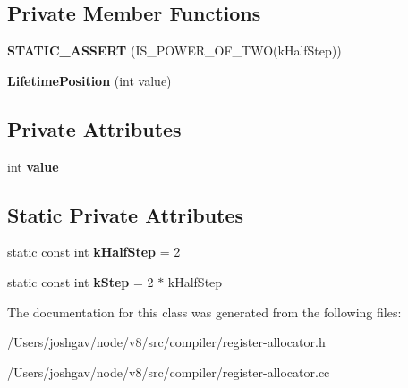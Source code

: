 \subsection*{Private Member Functions}
\begin{DoxyCompactItemize}
\item 
{\bfseries S\+T\+A\+T\+I\+C\+\_\+\+A\+S\+S\+E\+RT} (I\+S\+\_\+\+P\+O\+W\+E\+R\+\_\+\+O\+F\+\_\+\+T\+WO(k\+Half\+Step))\hypertarget{classv8_1_1internal_1_1compiler_1_1_lifetime_position_a87038ab747a896e034d24b830b7c9047}{}\label{classv8_1_1internal_1_1compiler_1_1_lifetime_position_a87038ab747a896e034d24b830b7c9047}

\item 
{\bfseries Lifetime\+Position} (int value)\hypertarget{classv8_1_1internal_1_1compiler_1_1_lifetime_position_ab504ab1e4af9c91c5551335b840c2344}{}\label{classv8_1_1internal_1_1compiler_1_1_lifetime_position_ab504ab1e4af9c91c5551335b840c2344}

\end{DoxyCompactItemize}
\subsection*{Private Attributes}
\begin{DoxyCompactItemize}
\item 
int {\bfseries value\+\_\+}\hypertarget{classv8_1_1internal_1_1compiler_1_1_lifetime_position_adfd9cc95ded60a9977c4ede147b374b4}{}\label{classv8_1_1internal_1_1compiler_1_1_lifetime_position_adfd9cc95ded60a9977c4ede147b374b4}

\end{DoxyCompactItemize}
\subsection*{Static Private Attributes}
\begin{DoxyCompactItemize}
\item 
static const int {\bfseries k\+Half\+Step} = 2\hypertarget{classv8_1_1internal_1_1compiler_1_1_lifetime_position_a909fe3ac1a2266279c4fb64980374771}{}\label{classv8_1_1internal_1_1compiler_1_1_lifetime_position_a909fe3ac1a2266279c4fb64980374771}

\item 
static const int {\bfseries k\+Step} = 2 $\ast$ k\+Half\+Step\hypertarget{classv8_1_1internal_1_1compiler_1_1_lifetime_position_a2f47a2ef3f291fbcb0cac7a1937350d1}{}\label{classv8_1_1internal_1_1compiler_1_1_lifetime_position_a2f47a2ef3f291fbcb0cac7a1937350d1}

\end{DoxyCompactItemize}


The documentation for this class was generated from the following files\+:\begin{DoxyCompactItemize}
\item 
/\+Users/joshgav/node/v8/src/compiler/register-\/allocator.\+h\item 
/\+Users/joshgav/node/v8/src/compiler/register-\/allocator.\+cc\end{DoxyCompactItemize}
